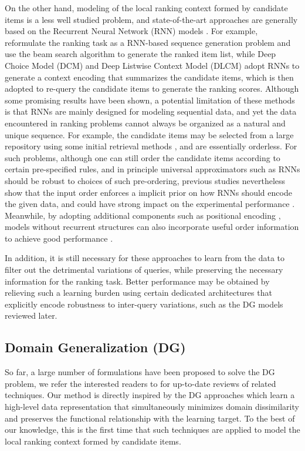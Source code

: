 \documentclass[letterpaper]{article} %
\begin{document}
On the other hand, modeling of the local ranking context formed by candidate items is a less well studied problem, and state-of-the-art approaches are generally based on the Recurrent Neural Network (RNN) models \cite{DCM,ai2018learning,zhuang2018globally}. For example, \cite{zhuang2018globally} reformulate the ranking task as a RNN-based sequence generation problem and use the beam search algorithm to generate the ranked item list, while Deep Choice Model (DCM) \cite{DCM} and Deep Listwise Context Model (DLCM) \cite{ai2018learning} adopt RNNs to generate a context encoding that summarizes the candidate items, which is then adopted to re-query the candidate items to generate the ranking scores. Although some promising results have been shown, a potential limitation of these methods is that RNNs are mainly designed for modeling sequential data, and yet the data encountered in ranking problems cannot always be organized as a natural and unique sequence. For example, the candidate items may be selected from a large repository using some initial retrieval methods \cite{covington2016deep,YahooL2R}, and are essentially orderless. For such problems, although one can still order the candidate items according to certain pre-specified rules, and in principle universal approximators such as RNNs should be robust to choices of such pre-ordering, previous studies nevertheless show that the input order enforces a implicit prior on how RNNs should encode the given data, and could have strong impact on the experimental performance \cite{OrderMatters}. Meanwhile, by adopting additional components such as positional encoding \cite{vaswani2017attention}, models without recurrent structures can also incorporate useful order information to achieve good performance \cite{vaswani2017attention,gehring2017convolutional,ATRANK}.

In addition, it is still necessary for these approaches to learn from the data to filter out the detrimental variations of queries, while preserving the necessary information for the ranking task. Better performance may be obtained by relieving such a learning burden using certain dedicated architectures that explicitly encode robustness to inter-query variations, such as the DG models reviewed later.

\subsection{Domain Generalization (DG)}

So far, a large number of formulations have been proposed to solve the DG problem, we refer the interested readers to \cite{li2018learning,shankar2018generalizing} for up-to-date reviews of related techniques. Our method is directly inspired by the DG approaches which learn a high-level data representation that simultaneously minimizes domain dissimilarity and preserves the functional relationship with the learning target. To the best of our knowledge, this is the first time that such techniques are applied to model the local ranking context formed by candidate items.
\end{document}
